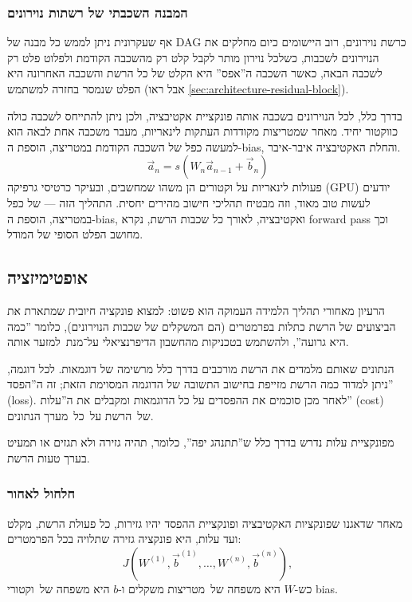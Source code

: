 \documentclass[hebrew, a4paper]{article}
\theoremstyle{plain}
\theoremstyle{definition}
\numberwithin{equation}{section}
\begin{document}
\subsubsection{המבנה השכבתי של רשתות נוירונים}
\label{sec:layers}

אף שעקרונית ניתן לממש כל מבנה של DAG כרשת נוירונים, רוב היישומים כיום
מחלקים את הנוירונים לשכבות, כשלכל נוירון מותר לקבל קלט רק מהשכבה
הקודמת ולפלוט פלט רק לשכבה הבאה, כאשר השכבה ה”אפס” היא הקלט של כל הרשת
והשכבה האחרונה היא הפלט שנמסר בחזרה למשתמש (אבל ראו
\autoref{sec:architecture-residual-block}).

בדרך כלל, לכל הנוירונים בשכבה אותה פונקציית אקטיבציה, ולכן ניתן להתייחס
לשכבה כולה כווקטור יחיד. מאחר שמטריצות מקודדות העתקות לינאריות, מעבר
משכבה אחת לבאה הוא למעשה כפל של השכבה הקודמת במטריצה, הוספת ה-bias,
והחלת האקטיבציה איבר-איבר.
\[
  \vec{a}_{n} = s(W_n\vec{a}_{n-1} + \vec{b}_n)
\]
פעולות לינאריות על וקטורים הן משהו שמחשבים, ובעיקר כרטיסי גרפיקה (GPU)
יודעים לעשות טוב מאוד, וזה מבטיח תהליכי חישוב מהירים יחסית. התהליך הזה
--- של כפל במטריצה, הוספת ה-bias, ואקטיבציה, לאורך כל שכבות הרשת, נקרא
forward pass וכך מחושב הפלט הסופי של המודל.

\subsection{אופטימיזציה}
\label{sec:optimization}

הרעיון מאחורי תהליך הלמידה העמוקה הוא פשוט: למצוא פונקציה חיובית
שמתארת את הביצועים של הרשת כתלות בפרמטרים (הם המשקלים של שכבות
הנוירונים), כלומר ”כמה היא גרועה”, ולהשתמש בטכניקות מהחשבון
הדיפרנציאלי על־מנת~למזער אותה.

הנתונים שאותם מלמדים את הרשת מורכבים בדרך כלל מרשימה של דוגמאות. לכל
דוגמה, ניתן למדוד כמה הרשת מזייפת בחישוב התשובה של הדוגמה המסוימת
הזאת; זה ה”הפסד” (loss). לאחר מכן סוכמים את ההפסדים על כל הדוגמאות
ומקבלים את ה”עלות” (cost) של~הרשת על~כל~מערך הנתונים.

מפונקציית עלות נדרש בדרך כלל ש”תתנהג יפה”, כלומר, תהיה גזירה ולא תגזים
או תמעיט בערך טעות הרשת.

\subsubsection{חלחול לאחור}
\label{sec:backpropagation}

מאחר שדאגנו שפונקציות האקטיבציה ופונקציית ההפסד יהיו גזירות, כל פעולת
הרשת, מקלט ועד עלות, היא פונקציה גזירה שתלויה בכל הפרמטרים:
\[
  J(W^{(1)},\vec{b}^{(1)},\ldots,W^{(n)},\vec{b}^{(n)}),
\]
כש-$W$ היא משפחה של~מטריצות משקלים ו-$b$ היא משפחה של~וקטורי bias.
\end{document}
